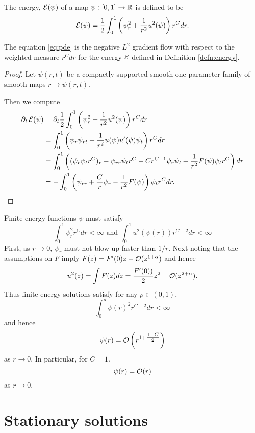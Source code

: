 \documentclass{amsart}
\begin{document}
\begin{defn}
\label{defn:energy}
The energy, \(\operatorname{\mathcal{E}}(\psi)\) of a map \(\psi: [0, 1] \to \mathbb{R}\) is defined to be
\[
\operatorname{\mathcal{E}}(\psi) = \frac{1}{2} \int_0^1 \left(\psi_r^2 + \frac{1}{r^2} u^2(\psi)\right) r^C dr.
\]
\end{defn}

\begin{lemma}
The equation \eqref{eq:pde} is the negative \(L^2\) gradient flow with respect to the weighted measure \(r^C dr\) for the energy \(\operatorname{\mathcal{E}}\) defined in Definition \ref{defn:energy}.
\end{lemma}

\begin{proof}
Let \(\psi(r, t)\) be a compactly supported smooth one-parameter family of smooth maps \(r \mapsto \psi(r, t)\).

Then we compute
\[
\begin{split}
\partial_t \operatorname{\mathcal{E}}(\psi) &= \partial_t \frac{1}{2} \int_0^1  \left(\psi_r^2 + \frac{1}{r^2} u^2(\psi)\right) r^C dr \\
&= \int_0^1  \left(\psi_r \psi_{rt} + \frac{1}{r^2} u(\psi)u'(\psi) \psi_t \right) r^C dr \\
&= \int_0^1 \left((\psi_r \psi_t r^C)_r - \psi_{rr} \psi_t r^C - C r^{C-1} \psi_r \psi_t + \frac{1}{r^2} F(\psi) \psi_t r^C\right) dr \\
&= - \int_0^1 \left(\psi_{rr} + \frac{C}{r} \psi_r - \frac{1}{r^2} F(\psi)\right) \psi_t r^C dr.
\end{split}
\]
\end{proof}

\begin{rem}
\label{rem:finite_energy}

Finite energy functions \(\psi\) must satisfy
\[
\int_0^1 \psi_r^2 r^C dr < \infty \text{ and } \int_0^1 u^2(\psi(r)) r^{C-2} dr < \infty
\]
First, as \(r\to 0\), \(\psi_r\) must not blow up faster than \(1/r\). Next noting that the assumptions on \(F\) imply \(F(z) = F'(0) z + \operatorname{\mathcal{O}}(z^{1+\alpha})\) and hence
\[
u^2(z) = \int F(z) dz = \frac{F'(0))}{2} z^2 + \operatorname{\mathcal{O}}(z^{2+\alpha}).
\]
Thus finite energy solutions satisfy for any \(\rho \in (0, 1)\),
\[
\int_0^{\rho} \psi(r)^2 r^{C-2} dr < \infty
\]
and hence
\[
\psi(r) = \operatorname{\mathcal{O}}\left(r^{1 + \tfrac{1-C}{2}}\right)
\]
as \(r \to 0\). In particular, for \(C = 1\).
\[
\psi(r) = \operatorname{\mathcal{O}}(r)
\]
as \(r \to 0\).
\end{rem}

\section{Stationary solutions}
\label{sec:stationary}
\end{document}
